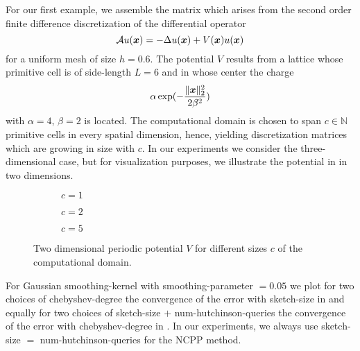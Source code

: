For our first example, we assemble the matrix which arises from the second order
finite difference discretization of the differential operator
\begin{equation}
    \mathcal{A} u(\boldsymbol{x}) = - \Delta u(\boldsymbol{x}) + V(\boldsymbol{x}) u(\boldsymbol{x})
    \label{equ:5-experiments-electronic-hamiltonian}
\end{equation}
for a uniform mesh of size $h=0.6$. The potential $V$ results from a
lattice whose primitive cell is of side-length $L=6$ and in whose center the
charge
\begin{equation}
    \alpha \exp(-\frac{\lVert \boldsymbol{x} \rVert _2^2}{ 2 \beta^2 })
    \label{equ:5-experiments-gaussian-cell}
\end{equation}
with $\alpha = 4$, $\beta = 2$ is located. The computational domain is chosen
to span $c \in \mathbb{N}$ primitive cells in every spatial dimension, hence, yielding
discretization matrices which are growing in size with $c$. In our experiments
we consider the three-dimensional case, but for visualization purposes, we
illustrate the potential in 
in two dimensions.\\

\begin{figure}[ht]
    \begin{subfigure}[b]{0.32\columnwidth}
        
        \caption{$c=1$}
        \label{fig:5-experiments-periodic-gaussian-well-1}
    \end{subfigure}
    \begin{subfigure}[b]{0.32\columnwidth}
        
        \caption{$c=2$}
        \label{fig:5-experiments-periodic-gaussian-well-2}
    \end{subfigure}
    \begin{subfigure}[b]{0.32\columnwidth}
        
        \caption{$c=5$}
        \label{fig:5-experiments-periodic-gaussian-well-5}
    \end{subfigure}
    \caption{Two dimensional periodic potential $V$ for different sizes $c$ of the computational domain.}
    \label{fig:5-experiments-periodic-gaussian-well}
\end{figure}

For Gaussian \gls{smoothing-kernel} 
with \gls{smoothing-parameter} $=0.05$ we plot for two choices of \gls{chebyshev-degree}
the convergence of the error with \gls{sketch-size} in 
and equally for two choices of \gls{sketch-size} $+$ \gls{num-hutchinson-queries} the convergence of the
error with \gls{chebyshev-degree} in .
In our experiments, we always use \gls{sketch-size} $=$ \gls{num-hutchinson-queries} for
the \gls{NCPP} method.\\

